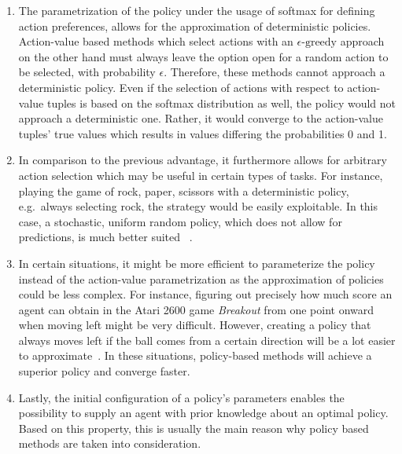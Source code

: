 \documentclass[draft,final]{vutinfth} %
\newcommand{\p}[1]{see p. #1}
\begin{document}
    \begin{enumerate}
        \item The parametrization of the policy under the usage of softmax for defining action preferences, allows for the approximation of deterministic policies.
        Action-value based methods which select actions with an $\epsilon\text{-greedy}$ approach on the other hand must always leave the option open for a random action to be selected, with probability $\epsilon$.
        Therefore, these methods cannot approach a deterministic policy.
        Even if the selection of actions with respect to action-value tuples is based on the softmax distribution as well, the policy would not approach a deterministic one.
        Rather, it would converge to the action-value tuples' true values which results in values differing the probabilities 0 and 1.
        \item In comparison to the previous advantage, it furthermore allows for arbitrary action selection which may be useful in certain types of tasks.
        For instance, playing the game of rock, paper, scissors with a deterministic policy, e.g.\ always selecting rock, the strategy would be easily exploitable.
        In this case, a stochastic, uniform random policy, which does not allow for predictions, is much better suited ~.
        \item In certain situations, it might be more efficient to parameterize the policy instead of the action-value parametrization as the approximation of policies could be less complex.
        For instance, figuring out precisely how much score an agent can obtain in the Atari 2600 game \textit{Breakout} from one point onward when moving left might be very difficult.
        However, creating a policy that always moves left if the ball comes from a certain direction will be a lot easier to approximate~.
        In these situations, policy-based methods will achieve a superior policy and converge faster\citep[\p{323}]{sutton_reinforcement_2018}.
        \item Lastly, the initial configuration of a policy's parameters enables the possibility to supply an agent with prior knowledge about an optimal policy.
        Based on this property, this is usually the main reason why policy based methods are taken into consideration.
    \end{enumerate}

    \glsresetall
\end{document}
